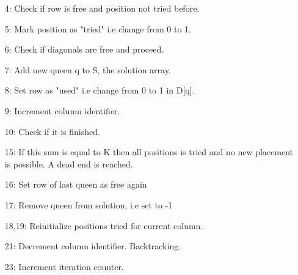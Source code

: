 \documentclass{article}
\begin{document}
\begin{enumerate}
    \item [4:] Check if row is free and position not tried before.
    \item [5:] Mark position as "tried" i.e change from 0 to 1.
    \item [6:] Check if diagonals are free and proceed.
    \item [7:] Add new queen q to S, the solution array.
    \item [8:] Set row as "used" i.e change from 0 to 1 in D[q].
    \item [9:] Increment column identifier.
    \item [10:] Check if it is finished.
    \item [15:] If this sum is equal to K then all positions is tried and 
                no new placement is possible. A dead end is reached.
    \item [16:] Set row of last queen as free again
    \item [17:] Remove queen from solution, i.e set to -1
    \item [18,19:] Reinitialize positions tried for current column. 
    \item [21:] Decrement column identifier. Backtracking.
    \item [23:] Increment iteration counter.
\end{enumerate}
\end{document}
